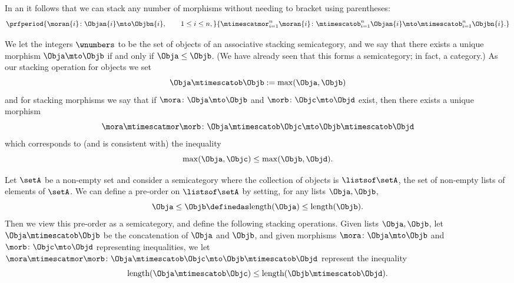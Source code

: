 \begin{remark}
    In an   it follows that we can stack any number of morphisms without needing to bracket using parentheses:
    \begin{equation}
        \prfperiod{
            \moran{i} \colon \Objan{i} \mto \Objbn{i}, \qquad 1 \leq i \leq n,
        }{
            \mtimescatmor_{i=1}^n \moran{i} \colon \mtimescatob_{i=1}^n \Objan{i} \mto \mtimescatob_{i=1}^n \Objbn{i}.
        }
    \end{equation}
\end{remark}

\begin{example}\label{ex:assoc-stacking-semicat-integers-max}
    We let the integers $\wnumbers$ to be the set of objects of an associative stacking semicategory, and we say that there exists a unique morphism $\Obja \mto \Objb$ if and only if $\Obja \leq \Objb$.
    (We have already seen that this forms a semicategory; in fact, a category.) As our stacking operation for objects we set
    \begin{equation}
        \Obja \mtimescatob \Objb := \max(\Obja, \Objb)
    \end{equation}
    and for stacking morphisms we say that if $\mora \colon \Obja \mto \Objb$ and $\morb \colon \Objc \mto \Objd$ exist, then there exists a unique morphism
    \begin{equation}
        \mora \mtimescatmor \morb \colon \Obja \mtimescatob \Objc \mto \Objb \mtimescatob \Objd
    \end{equation}
    which corresponds to (and is consistent with) the inequality
    \begin{equation}
        \max(\Obja, \Objc) \leq \max(\Objb, \Objd).
    \end{equation}
\end{example}

\begin{example}\label{ex:assoc-stacking-semicat-lists-concat}
    Let $\setA$ be a non-empty set and consider a semicategory where the collection of objects is $ \listsof \setA$, the set of non-empty lists of elements of $\setA$.
    We can define a pre-order on $\listsof \setA$ by setting, for any lists $\Obja, \Objb$,
    \begin{equation}
        \Obja \leq \Objb \definedas \text{length}(\Obja) \leq \text{length}(\Objb).
    \end{equation}
    Then we view this pre-order as a semicategory, and define the following stacking operations.
    Given lists $\Obja, \Objb$, let $\Obja \mtimescatob \Objb$ be the concatenation of $\Obja$ and $\Objb$, and given morphisms $\mora \colon \Obja \mto \Objb$ and $\morb \colon \Objc \mto \Objd$ representing inequalities, we let $\mora \mtimescatmor \morb \colon \Obja \mtimescatob \Objc \mto \Objb \mtimescatob \Objd$ represent the inequality
    \begin{equation}
        \text{length}(\Obja \mtimescatob \Objc) \leq \text{length}(\Objb \mtimescatob \Objd).
    \end{equation}

\end{example}

